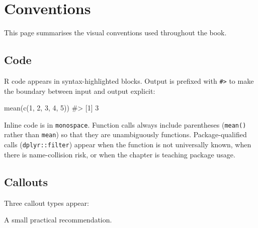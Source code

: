 \documentclass[
  letterpaper,
  11pt]{scrbook}
\newenvironment{Shaded}{\begin{snugshade}}{\end{snugshade}}
\newcommand{\CommentTok}[1]{\textcolor[rgb]{0.37,0.37,0.37}{#1}}
\newcommand{\DecValTok}[1]{\textcolor[rgb]{0.68,0.00,0.00}{#1}}
\newcommand{\FunctionTok}[1]{\textcolor[rgb]{0.28,0.35,0.67}{#1}}
\newcommand{\NormalTok}[1]{\textcolor[rgb]{0.00,0.23,0.31}{#1}}
\begin{document}

\chapter*{Conventions}\label{conventions}


This page summarises the visual conventions used throughout the book.

\section*{Code}\label{code}


R code appears in syntax-highlighted blocks. Output is prefixed with
\texttt{\#\textgreater{}} to make the boundary between input and output
explicit:

\begin{Shaded}
\begin{Highlighting}[]
\FunctionTok{mean}\NormalTok{(}\FunctionTok{c}\NormalTok{(}\DecValTok{1}\NormalTok{, }\DecValTok{2}\NormalTok{, }\DecValTok{3}\NormalTok{, }\DecValTok{4}\NormalTok{, }\DecValTok{5}\NormalTok{))}
\CommentTok{\#\textgreater{} [1] 3}
\end{Highlighting}
\end{Shaded}

Inline code is in \texttt{monospace}. Function calls always include
parentheses (\texttt{mean()} rather than \texttt{mean}) so that they are
unambiguously functions. Package-qualified calls
(\texttt{dplyr::filter}) appear when the function is not universally
known, when there is name-collision risk, or when the chapter is
teaching package usage.

\section*{Callouts}\label{callouts}


Three callout types appear:

\begin{tcolorbox}[enhanced jigsaw, arc=.35mm, bottomrule=.15mm, bottomtitle=1mm, breakable, colback=white, colbacktitle=quarto-callout-tip-color!10!white, colframe=quarto-callout-tip-color-frame, coltitle=black, left=2mm, leftrule=.75mm, opacityback=0, opacitybacktitle=0.6, rightrule=.15mm, title=\textcolor{quarto-callout-tip-color}{\faLightbulb}\hspace{0.5em}{Tip}, titlerule=0mm, toprule=.15mm, toptitle=1mm]

A small practical recommendation.

\end{tcolorbox}
\end{document}
